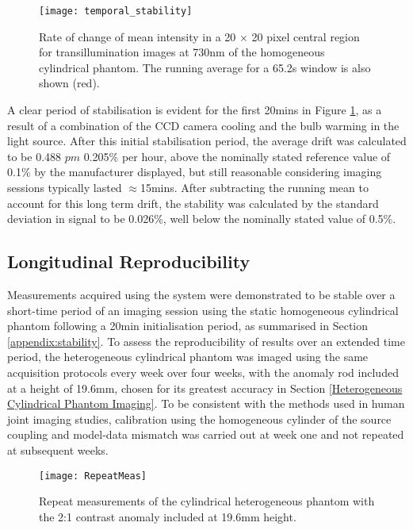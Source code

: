 \documentclass[twoside]{bhamthesis}
\theoremstyle{definition}
\begin{document}
\begin{figure}[!ht]
\centering
  \centering
  \texttt{[image: temporal\_stability]}
\caption{Rate of change of mean intensity in a 20 $\times$ 20 pixel central region for transillumination images at 730nm of the homogeneous cylindrical phantom. The running average for a 65.2s window is also shown (red).}
  \label{fig:Temporal_stability}
\end{figure}

A clear period of stabilisation is evident for the first 20mins in Figure \ref{fig:Temporal_stability}, as a result of a combination of the CCD camera cooling and the bulb warming in the light source. After this initial stabilisation period, the average drift was calculated to be 0.488 $pm$ 0.205\% per hour, above the nominally stated reference value of 0.1\% by the manufacturer displayed, but still reasonable considering imaging sessions typically lasted $\approx$15mins. After subtracting the running mean to account for this long term drift, the stability was calculated by the standard deviation in signal to be 0.026\%, well below the nominally stated value of 0.5\%.

\subsection{Longitudinal Reproducibility}

\label{Reproducibility}

Measurements acquired using the system were demonstrated to be stable over a short-time period of an imaging session using the static homogeneous cylindrical phantom following a 20min initialisation period, as summarised in Section \ref{appendix:stability}. To assess the reproducibility of results over an extended time period, the heterogeneous cylindrical phantom was imaged using the same acquisition protocols every week over four weeks, with the anomaly rod included at a height of 19.6mm, chosen for its greatest accuracy in Section \ref{Heterogeneous Cylindrical Phantom Imaging}. To be consistent with the methods used in human joint imaging studies, calibration using the homogeneous cylinder of the source coupling and model-data mismatch was carried out at week one and not repeated at subsequent weeks.

\begin{figure}[!ht]
\texttt{[image: RepeatMeas]}
\centering
\caption{Repeat measurements of the cylindrical heterogeneous phantom with the 2:1 contrast anomaly included at 19.6mm height.}
\centering
\label{tab:Repeats}
\end{figure}
\end{document}
